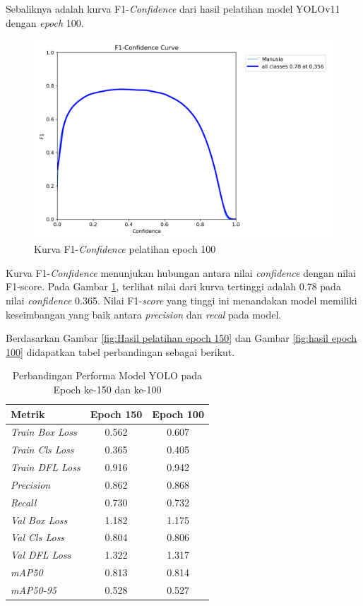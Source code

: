 Sebaliknya adalah kurva F1-\emph{Confidence} dari hasil pelatihan model YOLOv11 dengan \emph{epoch} 100.
\begin{figure} [H] \centering
  \includegraphics[scale=0.25]{gambar/F1_curve-100.png}
  \caption{Kurva F1-\emph{Confidence} pelatihan epoch 100}
  \label{fig:Pengujian Performa F1-100}
\end{figure}

Kurva F1-\emph{Confidence} menunjukan hubungan antara nilai \emph{confidence} dengan nilai F1-score. Pada Gambar \ref{fig:Pengujian Performa F1-100}, terlihat nilai dari kurva tertinggi adalah 0.78 pada nilai \emph{confidence} 0.365. Nilai F1-\emph{score} yang tinggi ini menandakan model memiliki keseimbangan yang baik
antara \emph{precision} dan \emph{recal} pada model.

Berdasarkan Gambar \ref{fig:Hasil pelatihan epoch 150} dan Gambar \ref{fig:hasil epoch 100} didapatkan tabel perbandingan sebagai berikut.

\begin{table}[H]
\centering
\caption{Perbandingan Performa Model YOLO pada Epoch ke-150 dan ke-100}
\label{tab:perbandingan_yolo}
\begin{tabular}{|l|c|c|}
\hline
\rowcolor[gray]{0.85}
\textbf{Metrik} & \textbf{Epoch 150} & \textbf{Epoch 100} \\ \hline
\emph{Train Box Loss} & 0.562 & 0.607 \\ \hline
\emph{Train Cls Loss} & 0.365 & 0.405 \\ \hline
\emph{Train DFL Loss} & 0.916 & 0.942 \\ \hline
\emph{Precision}      & 0.862 & 0.868 \\ \hline
\emph{Recall}         & 0.730 & 0.732 \\ \hline
\emph{Val Box Loss}   & 1.182 & 1.175 \\ \hline
\emph{Val Cls Loss}   & 0.804 & 0.806 \\ \hline
\emph{Val DFL Loss}   & 1.322 & 1.317 \\ \hline
\emph{mAP50}          & 0.813 & 0.814 \\ \hline
\emph{mAP50-95}       & 0.528 & 0.527 \\ \hline
\end{tabular}
\end{table}

